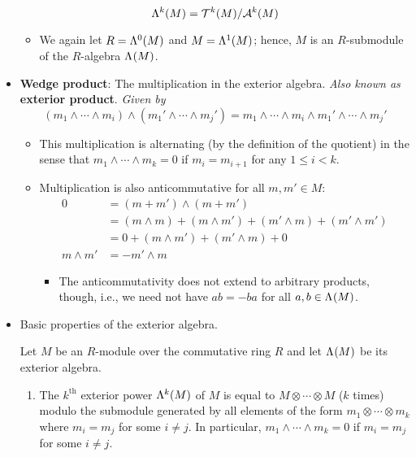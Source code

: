 \documentclass[../notes.tex]{subfiles}
\begin{document}
\begin{itemize}
\begin{equation*}
        \lam[k]{M} = \ten[k]{M}/\alt[k]{M}
    \end{equation*}
    \begin{itemize}
        \item We again let $R=\lam[0]{M}$ and $M=\lam[1]{M}$; hence, $M$ is an $R$-submodule of the $R$-algebra $\lam{M}$.
    \end{itemize}
    \item \textbf{Wedge product}: The multiplication in the exterior algebra. \emph{Also known as} \textbf{exterior product}. \emph{Given by}
    \begin{equation*}
        (m_1\wedge\cdots\wedge m_i)\wedge(m_1'\wedge\cdots\wedge m_j') = m_1\wedge\cdots\wedge m_i\wedge m_1'\wedge\cdots\wedge m_j'
    \end{equation*}
    \begin{itemize}
        \item This multiplication is alternating (by the definition of the quotient) in the sense that $m_1\wedge\cdots\wedge m_k=0$ if $m_i=m_{i+1}$ for any $1\leq i<k$.
        \item Multiplication is also anticommutative for all $m,m'\in M$:
        \begin{align*}
            0 &= (m+m')\wedge(m+m')\\
            &= (m\wedge m)+(m\wedge m')+(m'\wedge m)+(m'\wedge m')\\
            &= 0+(m\wedge m')+(m'\wedge m)+0\\
            m\wedge m' &= -m'\wedge m
        \end{align*}
        \begin{itemize}
            \item The anticommutativity does not extend to arbitrary products, though, i.e., we need not have $ab=-ba$ for all $a,b\in\lam{M}$.
        \end{itemize}
    \end{itemize}
    \item Basic properties of the exterior algebra.
    \begin{theorem}\label{trm:11.36}
        Let $M$ be an $R$-module over the commutative ring $R$ and let $\lam{M}$ be its exterior algebra.
        \begin{enumerate}
            \item The $k^\text{th}$ exterior power $\lam[k]{M}$ of $M$ is equal to $M\otimes\cdots\otimes M$ ($k$ times) modulo the submodule generated by all elements of the form $m_1\otimes\cdots\otimes m_k$ where $m_i=m_j$ for some $i\neq j$. In particular, $m_1\wedge\cdots\wedge m_k=0$ if $m_i=m_j$ for some $i\neq j$.

\end{enumerate}
\end{theorem}
\end{itemize}
\end{document}
